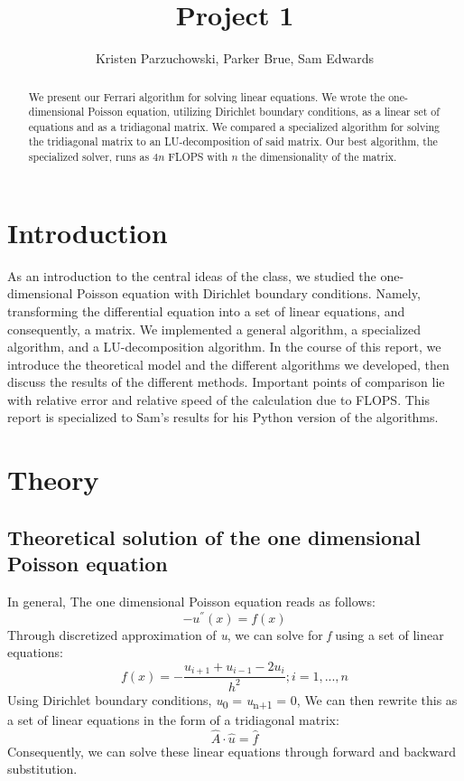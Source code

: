 \documentclass[10pt,showpacs,preprintnumbers,footinbib,amsmath,amssymb,aps,prl,twocolumn,groupedaddress,superscriptaddress,showkeys]{revtex4-1}
\begin{document}
\title{Project 1}
\author{Kristen Parzuchowski, Parker Brue, Sam Edwards}
\begin{abstract}
We present our Ferrari algorithm for solving linear equations. We wrote the one-dimensional Poisson equation, utilizing Dirichlet boundary conditions, as a linear set of equations and as a tridiagonal matrix. We compared a specialized algorithm for solving the tridiagonal matrix to an LU-decomposition of said matrix.  Our best algorithm, the specialized solver, runs as $4n$ FLOPS with $n$ the dimensionality of the matrix.
\end{abstract}
\maketitle

\section{Introduction}
As an introduction to the central ideas of the class, we studied the one-dimensional Poisson equation with Dirichlet boundary conditions. Namely, transforming the differential equation into a set of linear equations, and consequently, a matrix. We implemented a general algorithm, a specialized algorithm, and a LU-decomposition algorithm. In the course of this report, we introduce the theoretical model and the different algorithms  we developed, then discuss the results of the different methods. Important points of comparison lie with relative error and relative speed of the calculation due to FLOPS. This report is specialized to Sam's results for his Python version of the algorithms.

\section{Theory}
	\subsection{Theoretical solution of the one dimensional Poisson equation}	
In general, The one dimensional Poisson equation reads as follows: \begin{equation} -u^{''}(x) = f(x)     \end{equation}  Through discretized approximation of {\it u}, we can solve for {\it f} using a set of linear equations: \begin{equation}
	f(x)=-\frac{u_{i+1}+u_{i-1}-2u_{i}}{h^{2}}      ;      i=1,...,n
	\end{equation}
Using Dirichlet boundary conditions, {\it u}\textsubscript{0} = {\it u}\textsubscript{n+1} = 0,  We can then rewrite this as a set of linear equations in the form of a tridiagonal matrix: \begin{equation}	
	\hat{A} \cdot \hat{u} = \hat{f}
	\end{equation}
Consequently, we can solve these linear equations through forward and backward substitution.
\end{document}
